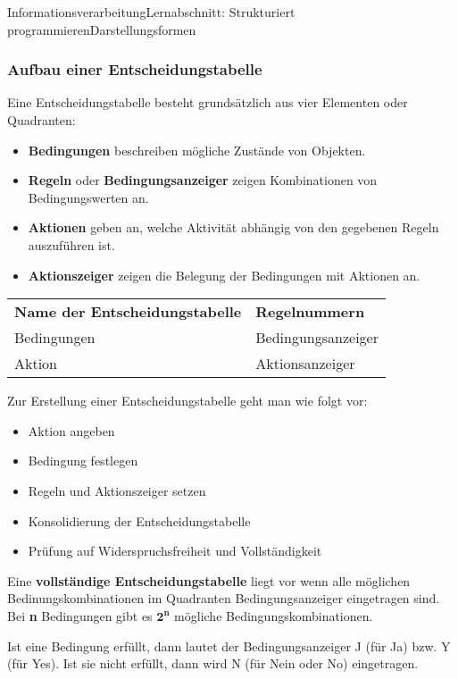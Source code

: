 \documentclass[11pt,oneside,openany,headings=optiontotoc,11pt,numbers=noenddot]{article}
\begin{document}
\begin{worksheet}{Informationsverarbeitung}{Lernabschnitt: Strukturiert programmieren}{Darstellungsformen}
		\subsubsection{Aufbau einer Entscheidungstabelle}
		Eine Entscheidungstabelle besteht grundsätzlich aus vier Elementen oder Quadranten:
		\begin{itemize}[label=-]
			\item \textbf{Bedingungen} beschreiben mögliche Zustände von Objekten.
			\item \textbf{Regeln} oder \textbf{Bedingungsanzeiger} zeigen Kombinationen von Bedingungswerten an.
			\item \textbf{Aktionen} geben an, welche Aktivität abhängig von den gegebenen Regeln auszuführen ist.
			\item \textbf{Aktionszeiger} zeigen die Belegung der Bedingungen mit Aktionen an.
		\end{itemize}
		\begin{tabularx}{\textwidth}{|L{4cm}|L{4cm}|}
			\textbf{Name der Entscheidungstabelle} & \textbf{Regelnummern}\\
			Bedingungen & Bedingungsanzeiger\\
			Aktion & Aktionsanzeiger\\
		\end{tabularx}
		\newpage
		Zur Erstellung einer Entscheidungstabelle geht man wie folgt vor:
		\begin{itemize}[label=-]
			\item Aktion angeben
			\item Bedingung festlegen
			\item Regeln und Aktionszeiger setzen
			\item Konsolidierung der Entscheidungstabelle
			\item Prüfung auf Widerspruchsfreiheit und Vollständigkeit
		\end{itemize}
		Eine \textbf{vollständige Entscheidungstabelle} liegt vor wenn alle möglichen Bedinungskombinationen im Quadranten \grqq{}Bedingungsanzeiger\grqq{} eingetragen sind. Bei \textbf{n} Bedingungen gibt es \(\mathbf{2^n}\) mögliche Bedingungskombinationen.\\
		\par\noindent
		Ist eine Bedingung erfüllt, dann lautet der Bedingungsanzeiger J (für Ja) bzw. Y (für Yes). Ist sie nicht erfüllt, dann wird N (für Nein oder No) eingetragen.\\
		\par\noindent

\end{worksheet}
\end{document}
